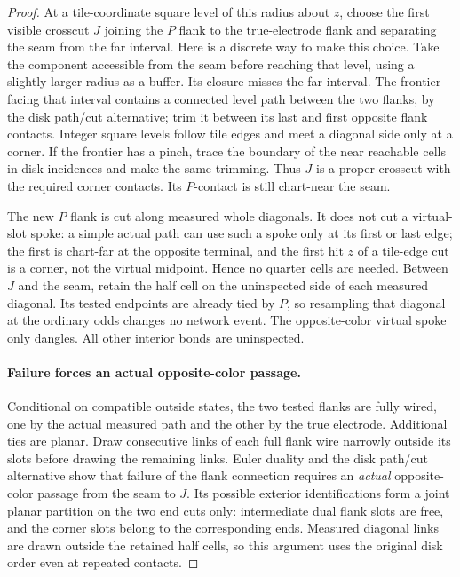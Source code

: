 \begin{proof}
At a tile-coordinate square level of this radius about $z$, choose
the first visible crosscut $J$ joining the $P$ flank to the
true-electrode flank and separating the seam from the far interval.
Here is a discrete way to make this choice.  Take the component
accessible from the seam before reaching that level, using a
slightly larger radius as a buffer.  Its closure misses the far
interval.  The frontier facing that interval contains a connected
level path between the two flanks, by the disk path/cut alternative;
trim it between its last and first opposite flank contacts.
Integer square levels follow tile edges and meet a diagonal side
only at a corner.  If the frontier has a pinch, trace the boundary
of the near reachable cells in disk incidences and make the same
trimming.  Thus $J$ is a proper crosscut with the required corner
contacts.  Its $P$-contact is still chart-near the seam.

The new $P$ flank is cut along measured whole diagonals.  It does
not cut a virtual-slot spoke: a simple actual path can use such a
spoke only at its first or last edge; the first is chart-far at
the opposite terminal, and the first hit $z$ of a tile-edge cut is
a corner, not the virtual midpoint.  Hence no quarter cells are
needed.  Between $J$ and the seam, retain the half cell on the
uninspected side of each measured diagonal.  Its tested endpoints
are already tied by $P$, so resampling that diagonal at the ordinary
odds changes no network event.  The opposite-color virtual spoke
only dangles.  All other interior bonds are uninspected.

\paragraph{Failure forces an actual opposite-color passage.}
Conditional on compatible outside states, the two tested flanks are
fully wired, one by the actual measured path and the other by the
true electrode.  Additional ties are planar.  Draw consecutive
links of each full flank wire narrowly outside its slots before
drawing the remaining links.  Euler duality and the disk path/cut
alternative show that failure of the flank connection requires an
\emph{actual} opposite-color passage from the seam to $J$.  Its
possible exterior identifications form a joint planar partition on
the two end cuts only: intermediate dual flank slots are free,
and the corner slots belong to the corresponding ends.  Measured
diagonal links are drawn outside the retained half cells, so this
argument uses the original disk order even at repeated contacts.


\end{proof}
